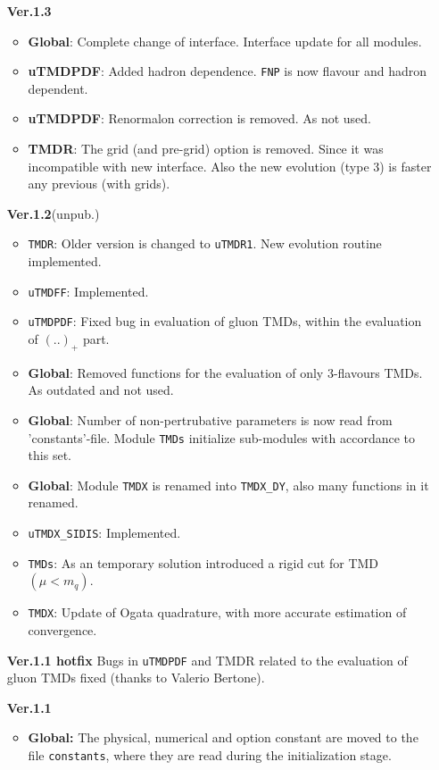 \documentclass[prd,nofootinbib,eqsecnum,final]{revtex4}
\renewcommand{\(}{\left(}
\renewcommand{\)}{\right)}
\renewcommand{\[}{\left[}
\renewcommand{\]}{\right]}
\begin{document}
\begin{itemize}
\item[\textbf{Ver.1.3}]
\begin{itemize}
\item \textbf{Global}: Complete change of interface. Interface update for all modules.
\item \textbf{uTMDPDF}: Added hadron dependence. \texttt{FNP} is now flavour and hadron dependent.
\item \textbf{uTMDPDF}: Renormalon correction is removed. As not used.
\item \textbf{TMDR}: The grid (and pre-grid) option is removed. Since it was incompatible with new interface. Also the new evolution (type 3) is faster any previous (with grids).
\end{itemize}

\item[\textbf{Ver.1.2}(unpub.)]
\begin{itemize}
\item \texttt{TMDR}: Older version is changed to \texttt{uTMDR1}. New evolution routine implemented.
\item \texttt{uTMDFF}: Implemented.
\item \texttt{uTMDPDF}: Fixed bug in evaluation of gluon TMDs, within the evaluation of $(..)_+$ part.
\item \textbf{Global}: Removed functions for the evaluation of only 3-flavours TMDs. As outdated and not used.
\item \textbf{Global}: Number of non-pertrubative parameters is now read from 'constants'-file. Module \texttt{TMDs} initialize sub-modules with accordance to this set.
\item \textbf{Global}: Module \texttt{TMDX} is renamed into \texttt{TMDX\_DY}, also many functions in it renamed.
\item \texttt{uTMDX\_SIDIS}: Implemented.
\item \texttt{TMDs}: As an temporary solution introduced a rigid cut for TMD$(\mu<m_q)$.
\item \texttt{TMDX}: Update of Ogata quadrature, with more accurate estimation of convergence.
\end{itemize} 
\item[\textbf{Ver.1.1 hotfix}] Bugs in \texttt{uTMDPDF} and {TMDR} related to the evaluation of gluon TMDs fixed (thanks to Valerio Bertone).
\item[\textbf{Ver.1.1}] 
\begin{itemize}
\item \textbf{Global:} The physical, numerical and option constant are moved to the file \texttt{constants}, where they are read during the initialization stage.

\end{itemize}
\end{itemize}
\end{document}
